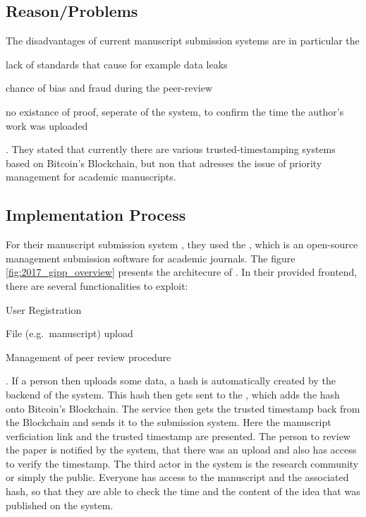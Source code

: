 
\subsection*{Reason/Problems}
The disadvantages of current manuscript submission systems are in particular the
\begin{enumerate*}[label={\arabic*)},font={\color{red!50!black}\bfseries}]
	\item lack of standards that cause for example data leaks
	\item chance of bias and fraud during the peer-review
	\item no existance of proof, seperate of the system, to confirm the time the author's work was uploaded
\end{enumerate*}.
They stated that currently there are various trusted-timestamping systems based on Bitcoin's Blockchain, but non that adresses the issue of priority management for academic manuscripts.


\subsection*{Implementation Process}
For their manuscript submission system , they used the , which is an open-source management submission software for academic journals.
The figure \ref{fig:2017_gipp_overview} presents the architecure of . In their provided frontend, there are several functionalities to exploit:
\begin{enumerate*}[label={\arabic*)},font={\color{red!50!black}\bfseries}]
	\item User Registration
	\item File (e.g.\ manuscript) upload
	\item Management of peer review procedure
\end{enumerate*}.
If a person then uploads some data, a hash is automatically created by the backend of the system. This hash then gets sent to the , which adds the hash onto Bitcoin's Blockchain. The service then gets the trusted timestamp back from the Blockchain and sends it to the submission system. Here the manuscript verficiation link and the trusted timestamp are presented. The person to review the paper is notified by the system, that there was an upload and also has access to verify the timestamp. The third actor in the system is the research community or simply the public. Everyone has access to the manuscript and the associated hash, so that they are able to check the time and the content of the idea that was published on the system.

